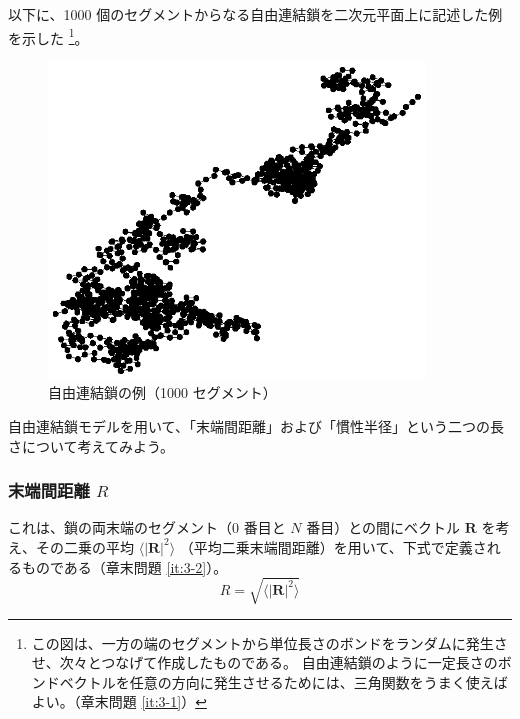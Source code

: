 \documentclass[11pt]{jsarticle}
\begin{document}
以下に、1000 個のセグメントからなる自由連結鎖を二次元平面上に記述した例を示した
\footnote
{
この図は、一方の端のセグメントから単位長さのボンドをランダムに発生させ、次々とつなげて作成したものである。
自由連結鎖のように一定長さのボンドベクトルを任意の方向に発生させるためには、三角関数をうまく使えばよい。（章末問題 \ref{it:3-1}）
}。
\begin{figure}[htb]
	\begin{center}
		\includegraphics[width=10cm]{figure/RF.eps}
		\caption{自由連結鎖の例（1000 セグメント）}
		\label{fig: RF}
	\end{center}
\end{figure}

自由連結鎖モデルを用いて、「末端間距離」および「慣性半径」という二つの長さについて考えてみよう。

\subsubsection{末端間距離 $R$}

これは、鎖の両末端のセグメント（0 番目と $N$ 番目）との間にベクトル $\bm{R}$ を考え、その二乗の平均 $\langle |\bm{R}|^2 \rangle$ （平均二乗末端間距離）を用いて、下式で定義されるものである（章末問題 \ref{it:3-2}）。
\begin{equation}
R=\sqrt{\langle |\bm{R}|^2 \rangle}
\end{equation}
\end{document}
